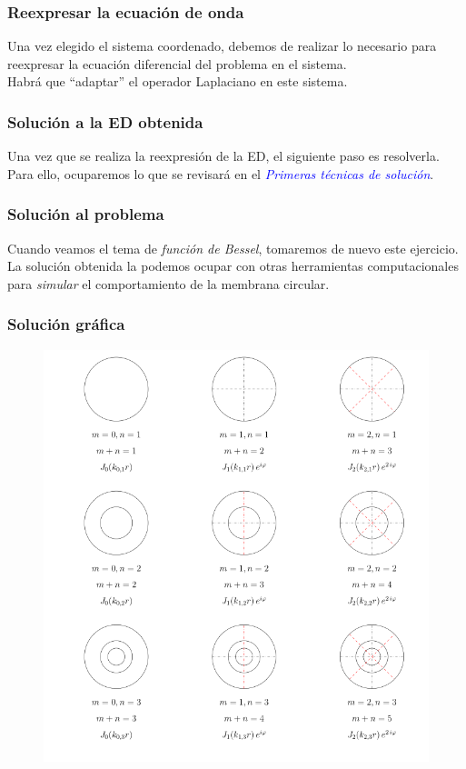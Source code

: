 \begin{frame}
\frametitle{Reexpresar la ecuación de onda}
Una vez elegido el sistema coordenado, debemos de realizar lo necesario para reexpresar la ecuación diferencial del problema en el sistema.
\\
\bigskip
\pause
Habrá que \enquote{adaptar} el operador Laplaciano en este sistema.
\end{frame}
\begin{frame}
\frametitle{Solución a la ED obtenida}
Una vez que se realiza la reexpresión de la ED, el siguiente paso es resolverla.
\\
\bigskip
\pause
Para ello, ocuparemos lo que se revisará en el \emph{\textcolor{blue}{Primeras técnicas de solución}}.
\end{frame}
\begin{frame}
\frametitle{Solución al problema}
Cuando veamos el tema de \emph{función de Bessel}, tomaremos de nuevo este ejercicio.
\\
\bigskip
\pause
La solución obtenida la podemos ocupar con otras herramientas computacionales para \emph{simular} el comportamiento de la membrana circular.
\end{frame}
\begin{frame}
\frametitle{Solución gráfica}
\begin{figure}[h!]
    \centering
    \includegraphics[scale=0.35]{Imagenes/Modos_Vibracion.png}
\end{figure}
\end{frame}
